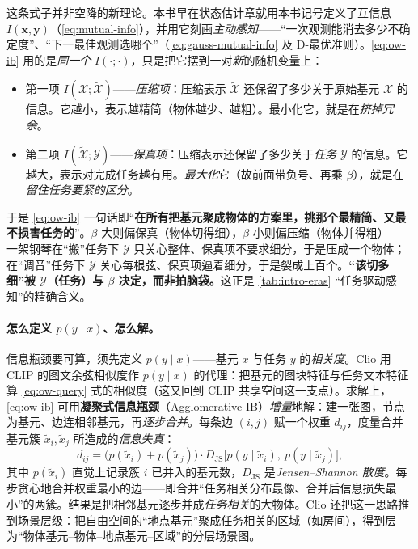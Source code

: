 \begin{insight}
这条式子并非空降的新理论。本书早在状态估计章就用本书记号定义了互信息 $I(\mathbf{x},\mathbf{y})$（\cref{eq:mutual-info}），并用它刻画\emph{主动感知}——“一次观测能消去多少不确定度”、“下一最佳观测选哪个”（\cref{eq:gauss-mutual-info} 及 D-最优准则）。\cref{eq:ow-ib} 用的是\emph{同一个} $I(\cdot;\cdot)$，只是把它摆到一对\emph{新}的随机变量上：

\begin{itemize}
  \item 第一项 $I(\mathcal{X};\tilde{\mathcal{X}})$——\emph{压缩项}：压缩表示 $\tilde{\mathcal{X}}$ 还保留了多少关于原始基元 $\mathcal{X}$ 的信息。它越小，表示越精简（物体越少、越粗）。最小化它，就是在\emph{挤掉冗余}。
  \item 第二项 $I(\tilde{\mathcal{X}};\mathcal{Y})$——\emph{保真项}：压缩表示还保留了多少关于\emph{任务} $\mathcal{Y}$ 的信息。它越大，表示对完成任务越有用。\emph{最大化}它（故前面带负号、再乘 $\beta$），就是在\emph{留住任务要紧的区分}。
\end{itemize}

\noindent 于是 \cref{eq:ow-ib} 一句话即“\textbf{在所有把基元聚成物体的方案里，挑那个最精简、又最不损害任务的}”。$\beta$ 大则偏保真（物体切得细），$\beta$ 小则偏压缩（物体并得粗）——一架钢琴在“搬”任务下 $\mathcal{Y}$ 只关心整体、保真项不要求细分，于是压成一个物体；在“调音”任务下 $\mathcal{Y}$ 关心每根弦、保真项逼着细分，于是裂成上百个。\textbf{“该切多细”被 $\mathcal{Y}$（任务）与 $\beta$ 决定，而非拍脑袋。}这正是 \cref{tab:intro-eras} “任务驱动感知”的精确含义。
\end{insight}

\paragraph{怎么定义 $p(y\mid x)$、怎么解。}
信息瓶颈要可算，须先定义 $p(y\mid x)$——基元 $x$ 与任务 $y$ 的\emph{相关度}。Clio 用 CLIP 的图文余弦相似度作 $p(y\mid x)$ 的代理：把基元的图块特征与任务文本特征算 \cref{eq:ow-query} 式的相似度（这又回到 CLIP 共享空间这一支点）。求解上，\cref{eq:ow-ib} 可用\textbf{凝聚式信息瓶颈}（Agglomerative IB）\cite{slonim1999aib}\emph{增量}地解：建一张图，节点为基元、边连相邻基元，再\emph{逐步合并}。每条边 $(i,j)$ 赋一个权重 $d_{ij}$，度量合并基元簇 $\tilde{x}_i,\tilde{x}_j$ 所造成的\emph{信息失真}：
\begin{equation}
  d_{ij}=\big(p(\tilde{x}_i)+p(\tilde{x}_j)\big)\cdot D_{\mathrm{JS}}\!\big[p(y\mid\tilde{x}_i),\ p(y\mid\tilde{x}_j)\big],
  \label{eq:ow-aib}
\end{equation}
其中 $p(\tilde{x}_i)$ 直觉上记录簇 $i$ 已并入的基元数，$D_{\mathrm{JS}}$ 是\emph{Jensen--Shannon 散度}。每步贪心地合并权重最小的边——即合并“任务相关分布最像、合并后信息损失最小”的两簇。结果是把相邻基元逐步并成\emph{任务相关}的大物体。Clio 还把这一思路推到场景层级：把自由空间的“地点基元”聚成任务相关的区域（如房间），得到层为“物体基元--物体--地点基元--区域”的分层场景图。

